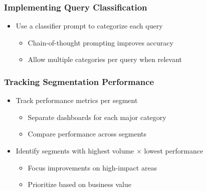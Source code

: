 \begin{frame}
    \frametitle{Implementing Query Classification}
    \begin{itemize}
        \item Use a classifier prompt to categorize each query
        \begin{itemize}
            \item Chain-of-thought prompting improves accuracy
            \item Allow multiple categories per query when relevant
        \end{itemize}
    \end{itemize}
    
    \vspace{0.5cm}
    
    \begin{center}
    \end{center}
\end{frame}

\begin{frame}
    \frametitle{Tracking Segmentation Performance}
    \begin{itemize}
        \item Track performance metrics per segment
        \begin{itemize}
            \item Separate dashboards for each major category
            \item Compare performance across segments
        \end{itemize}
        \item Identify segments with highest volume × lowest performance
        \begin{itemize}
            \item Focus improvements on high-impact areas
            \item Prioritize based on business value
        \end{itemize}
    \end{itemize}
\end{frame}

